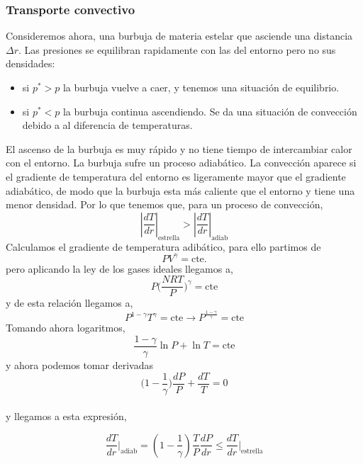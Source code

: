 \documentclass[openany]{book}
\theoremstyle{ucostyle}
\begin{document}
\subsubsection{Transporte convectivo}
Consideremos ahora, una burbuja de materia estelar que asciende una distancia $\Delta r$. 
Las presiones se equilibran rapidamente con las del entorno pero no sus densidades: 
\begin{itemize}
    \item si $p^*>p$ la burbuja vuelve a caer, y tenemos una situación de equilibrio. 
    \item si $p^*<p$ la burbuja continua ascendiendo. Se da una situación de convección debido a al diferencia de temperaturas. 
    \\
\end{itemize}
 El ascenso de la burbuja es muy rápido y no tiene tiempo de intercambiar calor con el entorno. La burbuja sufre un proceso adiabático. 
La convección aparece si el gradiente de temperatura del entorno es ligeramente mayor que el gradiente adiabático, de modo que la burbuja esta más caliente que el entorno y tiene una menor densidad. 
Por lo que tenemos que, para un proceso de convección, 
\begin{equation*}
    |\frac{dT}{dr}|_{\text{estrella}} >|\frac{dT}{dr}|_{\text{adiab}}
\end{equation*}
Calculamos el gradiente de temperatura adibático, para ello partimos de  
\begin{equation*}
    PV^{\gamma}=\text{cte.}
\end{equation*}
pero aplicando la ley de los gases ideales llegamos a, 
\begin{equation*}
    P\big(\frac{NRT}{P}\big)^{\gamma} = \text{cte}
\end{equation*}
y de esta relación llegamos a, 
\begin{equation*}
    P^{1-\gamma}T^{\gamma}= \text{cte} \rightarrow P^{\frac{1-\gamma}{\gamma}}=\text{cte}
\end{equation*}
Tomando ahora logaritmos, 
\begin{equation*}
    \frac{1-\gamma}{\gamma}\ln P+ \ln T
=\text{cte}
\end{equation*}
y ahora podemos tomar derivadas
\begin{equation*}
\big( 1-\frac{1}{\gamma}\big)\frac{dP}{P}+\frac{dT}{T}=0
\end{equation*} \
\\
y llegamos a esta expresión,

\begin{formula}
    \begin{equation*}
    \frac{dT}{dr}\Big|_{\text{adiab}} = \left(1-\frac{1}{\gamma}\right)\frac{T}{P}\frac{dP}{dr} \le \frac{dT}{dr}\Big|_{\text{estrella}}
\end{equation*}
\end{formula}
\end{document}
